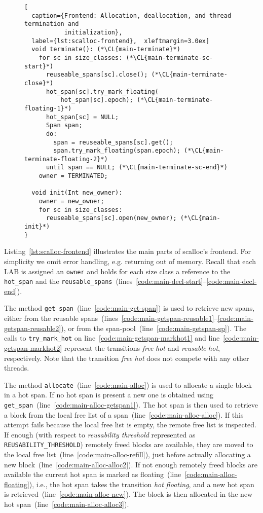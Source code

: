 \documentclass[10pt]{sigplanconf}
\newcommand{\CL}[1]{\label{code:#1}}
\newcommand{\lineRef}[1]{line~\ref{code:#1}}
\newcommand{\lineRangeRef}[2]{lines~\mbox{\ref{code:#1}--\ref{code:#2}}}
\newcommand{\impl}[1]{{\tt #1}\xspace}
\newcommand{\trans}[2]{{\it #1}  {\it #2}}
\begin{document}
\begin{figure}[ht!]
\begin{lstlisting}[
  caption={Frontend: Allocation, deallocation, and thread termination and
           initialization},
  label={lst:scalloc-frontend},  xleftmargin=3.0ex]
  void terminate(): (*\CL{main-terminate}*)
    for sc in size_classes: (*\CL{main-terminate-sc-start}*)
      reuseable_spans[sc].close(); (*\CL{main-terminate-close}*)
      hot_span[sc].try_mark_floating(
          hot_span[sc].epoch); (*\CL{main-terminate-floating-1}*)
      hot_span[sc] = NULL;
      Span span;
      do:
        span = reuseable_spans[sc].get();
        span.try_mark_floating(span.epoch); (*\CL{main-terminate-floating-2}*)
      until span == NULL; (*\CL{main-terminate-sc-end}*)
    owner = TERMINATED;

  void init(Int new_owner):
    owner = new_owner;
    for sc in size_classes:
      reuseable_spans[sc].open(new_owner); (*\CL{main-init}*)
}
\end{lstlisting}
\end{figure}

\bigbreak
Listing~\ref{lst:scalloc-frontend} illustrates the main parts of scalloc's
frontend. For simplicity we omit error handling, e.g. returning out of memory.
Recall that each LAB is assigned an \impl{owner} and holds for each size class a
reference to the \impl{hot\_span} and the
\impl{reusable\_spans}~(\lineRangeRef{main-decl-start}{main-decl-end}).

The method \impl{get\_span}~(\lineRef{main-get-span}) is used to retrieve new
spans, either from the reusable
spans~(\lineRangeRef{main-getspan-reusable1}{main-getspan-reusable2}), or from
the span-pool~(\lineRef{main-getspan-sp}). The calls to
\impl{try\_mark\_hot} on \lineRef{main-getspan-markhot1} and
\lineRef{main-getspan-markhot2} represent the transitions 
\trans{free}{hot} and \trans{reusable}{hot}, respectively. Note that the
transition \trans{free}{hot} does not compete with any other threads.

The method \impl{allocate}~(\lineRef{main-alloc}) is used to allocate a single
block in a hot span. If no hot span is present a new one is obtained using
\impl{get\_span}~(\lineRef{main-alloc-getspan1}). The hot span is then used to
retrieve a block from the local free list of a
span~(\lineRef{main-alloc-alloc}). If this attempt fails because the local free
list is empty, the remote free list is inspected. If enough (with respect to
\emph{reusability threshold} represented as \impl{REUSABILITY\_THRESHOLD})
remotely freed blocks are available, they are moved to the local free
list~(\lineRef{main-alloc-refill}), just before actually allocating a new
block~(\lineRef{main-alloc-alloc2}). If not enough remotely freed blocks are
available the current hot span is marked as
floating~(\lineRef{main-alloc-floating}), i.e., the hot span takes the
transition
\trans{hot}{floating}, and a new hot span is
retrieved~(\lineRef{main-alloc-new}). The block is then allocated in the new hot
span~(\lineRef{main-alloc-alloc3}).
\end{document}
